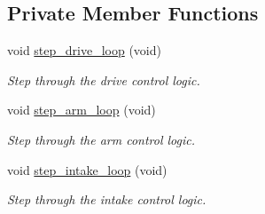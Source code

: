 \subsection*{Private Member Functions}
\begin{DoxyCompactItemize}
\item 
void \hyperlink{class_threaded_robot_ac4f1dd23e0b7ec167c9b80875d06d4c6}{step\+\_\+drive\+\_\+loop} (void)
\begin{DoxyCompactList}\small\item\em Step through the drive control logic. \end{DoxyCompactList}\item 
void \hyperlink{class_threaded_robot_a2224a8a7536e9ffb7d7a35c57280bddb}{step\+\_\+arm\+\_\+loop} (void)
\begin{DoxyCompactList}\small\item\em Step through the arm control logic. \end{DoxyCompactList}\item 
void \hyperlink{class_threaded_robot_ab1a8d6c3cc3e2df57701adfa23e1273d}{step\+\_\+intake\+\_\+loop} (void)
\begin{DoxyCompactList}\small\item\em Step through the intake control logic. \end{DoxyCompactList}\end{DoxyCompactItemize}
